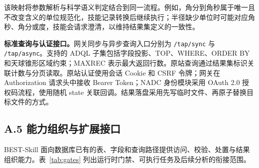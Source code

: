 \documentclass{dcfp}
\begin{document}
该映射将参数解析与科学语义判定结合到同一流程。例如，角分到角秒属于唯一且不改变含义的单位规范化，技能记录转换后继续执行；半径缺少单位时可能对应角秒、角分或度，技能会请求澄清，以维持结果集定义的一致性。


\noindent\textbf{标准查询与认证接口。}网关同步与异步查询入口分别为 \texttt{/tap/sync} 与 \texttt{/tap/async}。支持的 ADQL 子集包括字段投影、TOP、WHERE、ORDER BY 和天球锥形区域约束；MAXREC 表示最大返回行数。原站查询通过结果集标识关联计数与分页读取。原站认证使用会话 Cookie 和 CSRF 令牌；网关在 Authorization 请求头中接收 Bearer Token；NADC 身份模块采用 OAuth 2.0 授权码流程，使用随机 state 关联回调。结果落盘采用先写临时文件、再原子替换目标文件的方式。

\subsection*{A.5  能力组织与扩展接口}

BEST-Skill 面向数据库已有的表、字段和查询路径提供访问、校验、处置与结果组织能力。表~\ref{tab:gates} 列出运行时门禁、可执行任务及后续分析的衔接范围。
\end{document}
